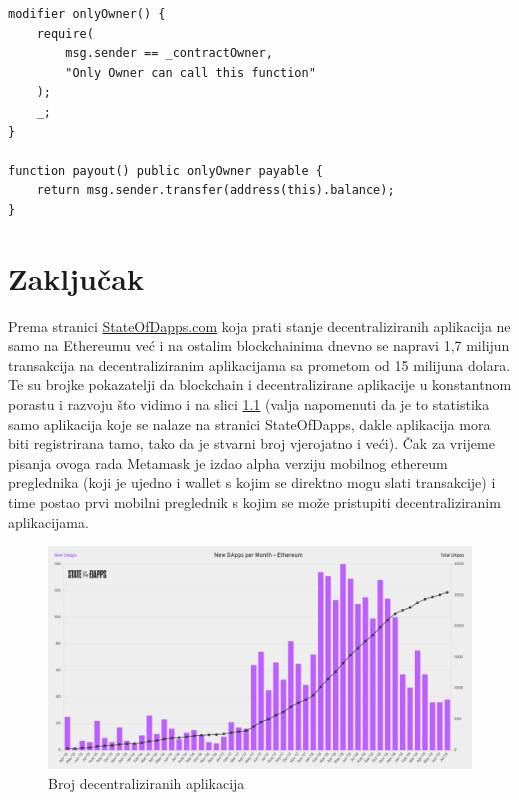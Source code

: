 \documentclass[a4paper,oneside,12pt]{memoir} %
\begin{document}
\begin{lstlisting}[caption=Ključna riječ \lstinline{modifier} označuje da slijedi kod modifikatora funkcije. U require naredbu možemo ubaciti sve uvjete koji želimo da budu zadovoljeni\, no tu samo zahtjevamo da je pozivatelj funkcije \lstinline{msg.sender} ujedno i vlasnik pametnog ugovora \lstinline{_contractOwner} (ovo je lokalna varijabla koja se postavlja u kontruktoru\, jer nema jednostavnog načina za naći vlasnika pametnog ugovora osim ići kroz prošlost transakcija koje uključuju ugovor.) Funkcija payout uplaćuje ether sa ugovora \lstinline{address(this).balance} pozivatelja funkcije (tj. vlasnika ugovora), label={code:modif}]
modifier onlyOwner() {
    require(
        msg.sender == _contractOwner,
        "Only Owner can call this function"
    );
    _;
}
    
function payout() public onlyOwner payable {
    return msg.sender.transfer(address(this).balance);
}
\end{lstlisting}

\chapter{Zaključak}

Prema stranici \href{https://www.stateofthedapps.com/}{StateOfDapps.com} koja prati stanje decentraliziranih aplikacija ne samo na Ethereumu već i na ostalim blockchainima dnevno se napravi 1,7 milijun transakcija na decentraliziranim aplikacijama sa prometom od 15 milijuna dolara. Te su brojke pokazatelji da blockchain i decentralizirane aplikacije u konstantnom porastu i razvoju što vidimo i na slici \ref{fig:stats} (valja napomenuti da je to statistika samo aplikacija koje se nalaze na stranici StateOfDapps, dakle aplikacija mora biti registrirana tamo, tako da je stvarni broj vjerojatno i veći). Čak za vrijeme pisanja ovoga rada Metamask je izdao alpha verziju mobilnog ethereum preglednika (koji je ujedno i wallet s kojim se direktno mogu slati transakcije) i time postao prvi mobilni preglednik s kojim se može pristupiti decentraliziranim aplikacijama.

\begin{figure}[H]
\centering
\includegraphics[scale=0.37]{dapps_stats}
\caption{Broj decentraliziranih aplikacija}
\label{fig:stats}
\end{figure}
\end{document}
